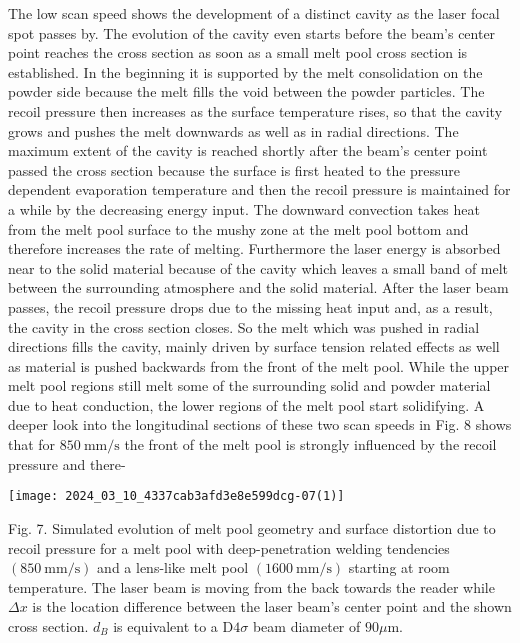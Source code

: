 \documentclass[10pt]{article}
\begin{document}
The low scan speed shows the development of a distinct cavity as the laser focal spot passes by. The evolution of the cavity even starts before the beam's center point reaches the cross section as soon as a small melt pool cross section is established. In the beginning it is supported by the melt consolidation on the powder side because the melt fills the void between the powder particles. The recoil pressure then increases as the surface temperature rises, so that the cavity grows and pushes the melt downwards as well as in radial directions. The maximum extent of the cavity is reached shortly after the beam's center point passed the cross section because the surface is first heated to the pressure dependent evaporation temperature and then the recoil pressure is maintained for a while by the decreasing energy input. The downward convection takes heat from the melt pool surface to the mushy zone at the melt pool bottom and therefore increases the rate of melting. Furthermore the laser energy is absorbed near to the solid material because of the cavity which leaves a small band of melt between the surrounding atmosphere and the solid material. After the laser beam passes, the recoil pressure drops due to the missing heat input and, as a result, the cavity in the cross section closes. So the melt which was pushed in radial directions fills the cavity, mainly driven by surface tension related effects as well as material is pushed backwards from the front of the melt pool. While the upper melt pool regions still melt some of the surrounding solid and powder material due to heat conduction, the lower regions of the melt pool start solidifying. A deeper look into the longitudinal sections of these two scan speeds in Fig. 8 shows that for $850 \mathrm{~mm} / \mathrm{s}$ the front of the melt pool is strongly influenced by the recoil pressure and there-

\begin{center}
\texttt{[image: 2024\_03\_10\_4337cab3afd3e8e599dcg-07(1)]}
\end{center}

Fig. 7. Simulated evolution of melt pool geometry and surface distortion due to recoil pressure for a melt pool with deep-penetration welding tendencies $(850 \mathrm{~mm} / \mathrm{s})$ and a lens-like melt pool $(1600 \mathrm{~mm} / \mathrm{s})$ starting at room temperature. The laser beam is moving from the back towards the reader while $\Delta x$ is the location difference between the laser beam's center point and the shown cross section. $d_{B}$ is equivalent to a $\mathrm{D} 4 \sigma$ beam diameter of $90 \mu \mathrm{m}$.
\end{document}
